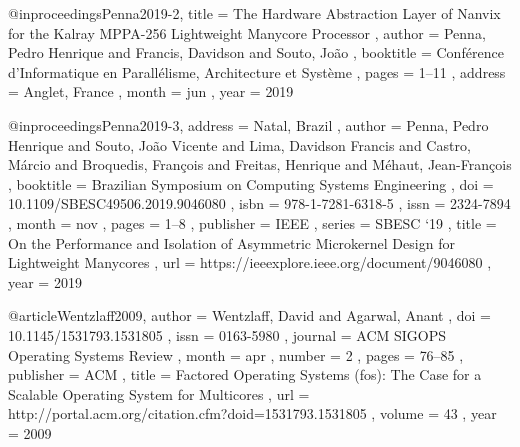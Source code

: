 @inproceedings{Penna2019-2,
    title     = { The Hardware Abstraction Layer of Nanvix for
                  the Kalray MPPA-256 Lightweight Manycore Processor },
    author    = { Penna, Pedro Henrique and
                  Francis, Davidson and
                  Souto, Jo{\~{a}}o
    },
    booktitle = { Conf{\'{e}}rence d'Informatique en
                  Parall{\'{e}}lisme, Architecture et Syst{\`{e}}me
    },
    pages     = { 1--11 },
    address   = { Anglet, France },
    month     = { jun },
    year      = { 2019 }
}

@inproceedings{Penna2019-3,
	address   = { Natal, Brazil },
	author    = { Penna, Pedro Henrique and
		          Souto, Jo{\~{a}}o Vicente and
			      Lima, Davidson Francis and
				  Castro, M{\'{a}}rcio and
				  Broquedis, Fran{\c{c}}ois and
				  Freitas, Henrique and
				  M{\'{e}}haut,
				  Jean-Fran{\c{c}}ois
	},
	booktitle = { Brazilian Symposium on Computing Systems Engineering },
	doi       = { 10.1109/SBESC49506.2019.9046080 },
	isbn      = { 978-1-7281-6318-5 },
	issn      = { 2324-7894 },
	month     = { nov },
	pages     = { 1--8 },
	publisher = { IEEE },
	series    = { SBESC `19 },
	title     = { On the Performance and Isolation of Asymmetric Microkernel Design for Lightweight Manycores },
	url       = { https://ieeexplore.ieee.org/document/9046080 },
	year      = { 2019 }
}

@article{Wentzlaff2009,
    author    = { Wentzlaff, David and Agarwal, Anant },
    doi       = { 10.1145/1531793.1531805 },
    issn      = { 0163-5980 },
    journal   = { ACM SIGOPS Operating Systems Review },
    month     = { apr },
    number    = { 2 },
    pages     = { 76--85 },
    publisher = { ACM },
    title     = { Factored Operating Systems (fos): The Case for a Scalable Operating System for Multicores },
    url       = { http://portal.acm.org/citation.cfm?doid=1531793.1531805 },
    volume    = { 43 },
    year      = { 2009 }
}
